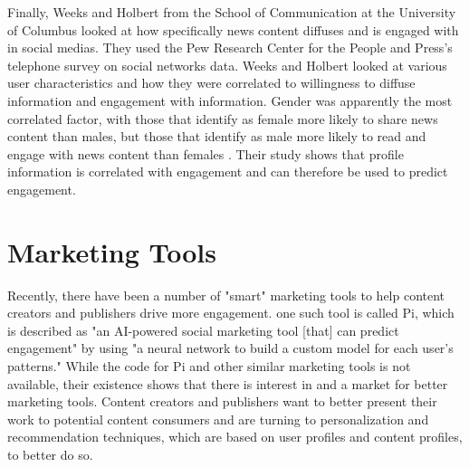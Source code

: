 Finally, Weeks and Holbert from the School of Communication at the University of Columbus looked at how specifically news content diffuses and is engaged with in social medias.  They used the Pew Research Center for the People and Press's telephone survey on social networks data.  Weeks and Holbert looked at various user characteristics and how they were correlated to willingness to diffuse information and engagement with information.  Gender was apparently the most correlated factor, with those that identify as female more likely to share news content than males, but those that identify as male more likely to read and engage with news content than females \cite{weeks}.  Their study shows that profile information is correlated with engagement and can therefore be used to predict engagement.

\section{Marketing Tools} \label{ch:marketing}
Recently, there have been a number of "smart" marketing tools to help content creators and publishers drive more engagement.  one such tool is called Pi, which is described as "an AI-powered social marketing tool [that] can predict engagement" by using "a neural network to build a custom model for each user's patterns."  While the code for Pi and other similar marketing tools is not available, their existence shows that there is interest in and a market for better marketing tools.  Content creators and publishers want to better present their work to potential content consumers and are turning to personalization and recommendation techniques, which are based on user profiles and content profiles, to better do so.













